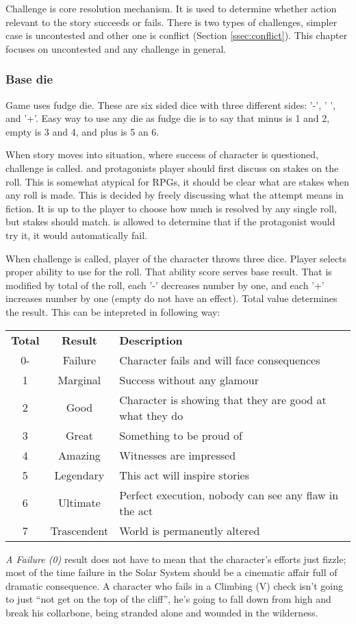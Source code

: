 Challenge is core resolution mechanism.
It is used to determine whether action relevant to the story succeeds or fails.
There is two types of challenges, simpler case is uncontested and other one is conflict (Section \ref{ssec:conflict}).
This chapter focuses on uncontested and any challenge in general.

\subsubsection{Base die}

Game uses fudge die.
These are six sided dice with three different sides: '-', ' ', and '+'.
Easy way to use any die as fudge die is to say that minus is 1 and 2, empty is 3 and 4, and plus is 5 an 6.

When story moves into situation, where success of character is questioned, challenge is called.
\GM{} and protagonists player should first discuss on stakes on the roll.
This is somewhat atypical for RPGs, it should be clear what are stakes when any roll is made.
This is decided by freely discussing what the attempt means in fiction.
It is up to the player to choose how much is resolved by any single roll, but stakes should match.
\GM{} is allowed to determine that if the protagonist would try it, it would automatically fail.

When challenge is called, player of the character throws three dice.
Player selects proper ability to use for the roll.
That ability score serves base result.
That is modified by total of the roll, each '-' decreases number by one, and each '+' increases number by one (empty do not have an effect).
Total value determines the result.
This can be intepreted in following way:
\begin{center}
\begin{tabular}{ c c l }
 \textbf{Total} & \textbf{Result} & \textbf{Description}\\ 
 0- & Failure & Character fails and will face consequences \\
 1 & Marginal & Success without any glamour \\
 2 & Good & Character is showing that they are good at what they do \\
 3 & Great & Something to be proud of \\
 4 & Amazing & Witnesses are impressed \\
 5 & Legendary & This act will inspire stories \\
 6 & Ultimate & Perfect execution, nobody can see any flaw in the act \\
 7 & Trascendent & World is permanently altered
\end{tabular}
\end{center}
\textit{A Failure (0)} result does not have to mean that the character’s efforts just fizzle; 
	most of the time failure in the Solar System should be a cinematic affair full of dramatic consequence. 
A character who fails in a Climbing (V) check isn’t going to just “not get on the top of the cliff”, 
	he’s going to fall down from high and break his collarbone, being stranded alone and wounded in the wilderness.

